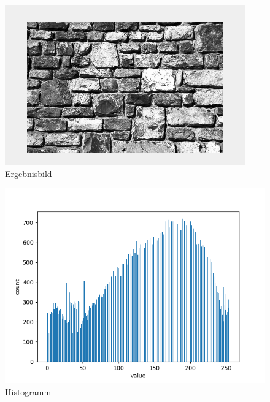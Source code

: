 \documentclass[12pt]{article}
\begin{document}
\begin{figure}[h]
  \centering
  \begin{minipage}{0.32\textwidth}
    \centering
    \includegraphics[width=\textwidth]{ergebnisbild.png}
    Ergebnisbild
  \end{minipage}
  \hfill
  \begin{minipage}{0.32\textwidth}
    \centering
    \includegraphics[width=\textwidth]{ergebnisbild_histogramm.png}
    Histogramm
  \end{minipage}
  \hfill
  \begin{minipage}{0.32\textwidth}
    \centering

\end{minipage}
\end{figure}
\end{document}
